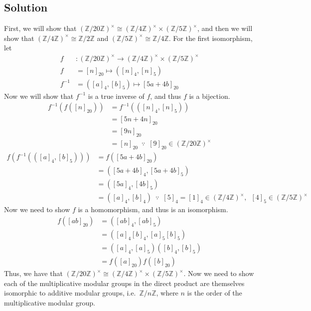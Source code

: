 \documentclass[fleqn]{article}
\begin{document}
        \subsection{Solution}
        First, we will show that $(\mathbb{Z}/20\mathbb{Z})^\times \cong (\mathbb{Z}/4\mathbb{Z})^\times \times (\mathbb{Z}/5\mathbb{Z})^\times$, and then we will show that $(\mathbb{Z}/4\mathbb{Z})^\times \cong \mathbb{Z}/2\mathbb{Z}$ and $(\mathbb{Z}/5\mathbb{Z})^\times \cong \mathbb{Z}/4\mathbb{Z}$.  For the first isomorphism, let 
        \begin{align}
            f&: (\mathbb{Z}/20\mathbb{Z})^\times \to (\mathbb{Z}/4\mathbb{Z})^\times \times (\mathbb{Z}/5\mathbb{Z})^\times \\
            f &= [n]_{20} \mapsto ([n]_4, [n]_5) \\
            f^{-1} &= ([a]_4, [b]_5) \mapsto [5a + 4b]_{20}
        \end{align}
        Now we will show that $f^{-1}$ is a true inverse of $f$, and thus $f$ is a bijection.
        \begin{align}
            f^{-1}(f([n]_{20})) &= f^{-1}(([n]_4, [n]_5)) \\
            &= [5n + 4n]_{20} \\
            &= [9n]_{20} \\
            &= [n]_{20} \enspace \because{} \enspace [9]_{20} \in (\mathbb{Z}/20\mathbb{Z})^\times
        \end{align}
        \begin{align}
            f(f^{-1}(([a]_4, [b]_5))) &= f([5a + 4b]_{20}) \\
            &= ([5a + 4b]_4, [5a + 4b]_5) \\
            &= ([5a]_4, [4b]_5) \\
            &= ([a]_4, [b]_4) \enspace \because{} \enspace [5]_4 = [1]_4 \in (\mathbb{Z}/4\mathbb{Z})^\times, \enspace [4]_5 \in (\mathbb{Z}/5\mathbb{Z})^\times
        \end{align}
        Now we need to show $f$ is a homomorphism, and thus is an isomorphism.
        \begin{align}
            f([ab]_{20}) &= ([ab]_4, [ab]_5) \\
            &= ([a]_4 [b]_4, [a]_5 [b]_5) \\
            &= ([a]_4, [a]_5)([b]_4, [b]_5) \\
            &= f([a]_{20}) f([b]_{20})
        \end{align}
        Thus, we have that $(\mathbb{Z}/20\mathbb{Z})^\times \cong (\mathbb{Z}/4\mathbb{Z})^\times \times (\mathbb{Z}/5\mathbb{Z})^\times$.  Now we need to show each of the multiplicative modular groups in the direct product are themselves isomorphic to additive modular groups, i.e.\ $\mathbb{Z}/n\mathbb{Z}$, where $n$ is the order of the multiplicative modular group.
        
\end{document}
